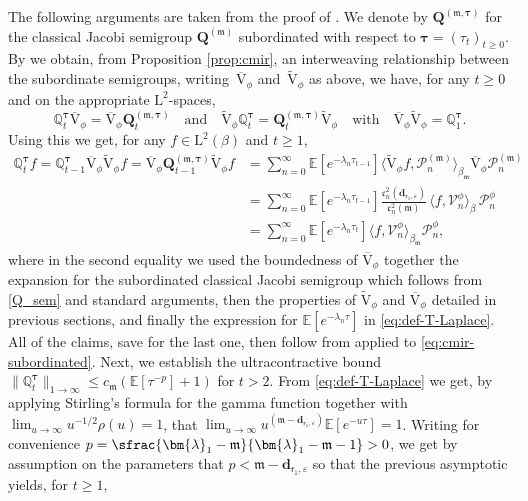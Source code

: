 \documentclass[JEP,XML,SOM,Unicode]{cedram}
\let\epsilon\varepsilon
\theoremstyle{plain}
\theoremstyle{definition}
\newcommand{\E}{\mathbb{E}}
\renewcommand{\P}{\mathcal{P}}
\newcommand{\V}{\mathcal{V}}
\newcommand{\J}{\mathds{Q}}
\newcommand{\Leb}{\mathrm{L}}
\newcommand{\m}{\mathfrak{m}}
\newcommand{\dpt}{\bm{d}_{\vat,\epsilon}}
\newcommand{\lam}{{\bm{\lambda}_1}}
\newcommand{\vat}{{\mathsf{r}_1}}
\newcommand{\Q}[1][\mo]{\mathbf{Q}^{({#1})}}
\newcommand{\gab}[1][\lam,\mo]{{\beta_{#1}}}
\let\mo\mu
\let\bpsi\beta
\begin{document}
The following arguments are taken from the proof of \cite[Prop.\,5]{Gateway}. We denote by $\Q[\m,\bm{\tau}]$ for the classical Jacobi semigroup $\Q[\m]$ subordinated with respect to $\bm{\tau} = (\tau_t)_{t \geq 0}$. By \cite[Th.\,3]{Patie-Miclo} we obtain, from Proposition \ref{prop:cmir}, an interweaving relationship between the subordinate semigroups, \ie writing~$\overline{\mathrm{V}}_\phi$ and~$\widetilde{\mathrm{V}}_\phi$ as above, we have, for any $t \geq 0$ and on the appropriate $\Leb^2$-spaces,
\begin{equation}
\label{eq:cmir-subordinated}
\J_t^{\bm{\tau}} \overline{\mathrm{V}}_\phi = \overline{\mathrm{V}}_\phi \Q[\m,\bm{\tau}]_t \quad \text{and} \quad \widetilde{\mathrm{V}}_\phi \J_t^{\bm{\tau}} = \Q[\m,\bm{\tau}]_t \widetilde{\mathrm{V}}_\phi \quad \text{with} \quad \overline{\mathrm{V}}_\phi\widetilde{\mathrm{V}}_\phi = \J_1^{\bm{\tau}}.
\end{equation}
Using this we get, for any $f \in \Leb^2(\bpsi)$ and $t \geq 1$,
\begin{align*}
\J_t^{\bm{\tau}} f = \J_{t-1}^{\bm{\tau}} \overline{\mathrm{V}}_\phi \widetilde{\mathrm{V}}_\phi f = \overline{\mathrm{V}}_\phi \Q[\m,\bm{\tau}]_{t-1} \widetilde{\mathrm{V}}_\phi f &= \sum_{n=0}^\infty \E\left[e^{-\lambda_n \tau_{t-1}}\right] \langle \widetilde{\mathrm{V}}_\phi f, \P_n^{(\m)} \rangle_{\gab[\m]} \overline{\mathrm{V}}_\phi \P_n^{(\m)} \\
&= \sum_{n=0}^\infty \E\left[e^{-\lambda_n \tau_{t-1}}\right] \frac{\mathfrak{c}_n^2(\dpt)}{\mathfrak{c}_n^2(\m)}\, \langle f, \V_n^\phi \rangle_{\bpsi}\, \P_n^\phi \\
&= \sum_{n=0}^\infty \E\left[e^{-\lambda_n \tau_t}\right] \langle f, \V_n^\phi \rangle_{\gab[\m]} \P_n^\phi,
\end{align*}
where in the second equality we used the boundedness of $\overline{\mathrm{V}}_\phi$ together the expansion for the subordinated classical Jacobi semigroup which follows from \eqref{Q_sem} and standard arguments, then the properties of $\widetilde{\mathrm{V}}_\phi$ and $\overline{\mathrm{V}}_\phi$ detailed in previous sections, and finally the expression for $\E[e^{-\lambda_n \tau}]$ in \eqref{eq:def-T-Laplace}. All of the claims, save for the last one, then follow from \cite[Ths.\,7, 24]{Patie-Miclo} applied to \eqref{eq:cmir-subordinated}. Next, we establish the ultracontractive bound $\|\J_t^{\bm{\tau}}\|_{1\to\infty} \leq c_\m(\E[\tau^{-p}]+1)$ for $t > 2$. From \eqref{eq:def-T-Laplace} we get, by applying Stirling's formula for the gamma function together with $\lim_{u \to \infty} u^{-1/2}\rho(u) = 1$, that $\lim_{u \to \infty} u^{(\m-\dpt)} \E[e^{-u \tau}] = 1$. Writing for convenience $p = \sfrac{\lam-\m}{\lam-\m-1} > 0$, we get by assumption on the parameters that $p < \m-\dpt$ so that the previous asymptotic yields, for $t \geq 1$,
\end{document}
